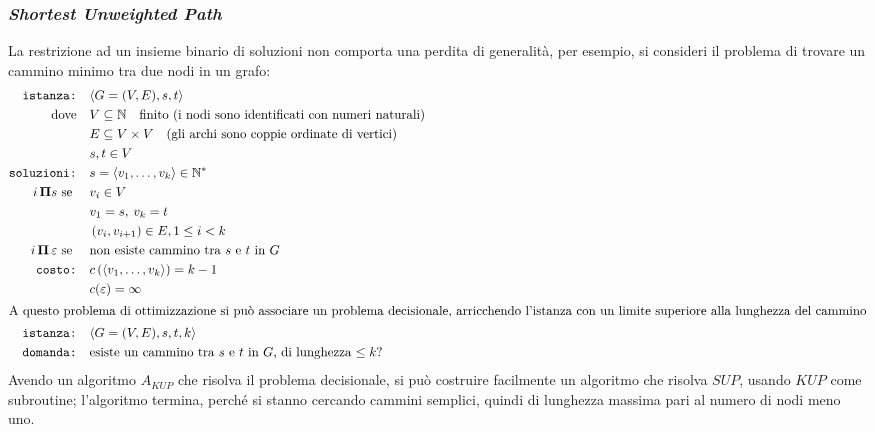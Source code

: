 \subsubsection{\emph{Shortest Unweighted Path}}
La restrizione ad un insieme binario di soluzioni non comporta una perdita di generalità, per esempio, si consideri il problema di trovare un cammino minimo tra due nodi in un grafo:
\begin{align*}
    \texttt{istanza:} \quad & \langle G=(V,E), s, t \rangle \\
    \text{dove} \quad & V \subseteq \mathbb{N} \quad \text{finito (i nodi sono identificati con numeri naturali)} \\
    & E \subseteq V \times V \quad \text{(gli archi sono coppie ordinate di vertici)} \\
    & s, t \in V \\
    \texttt{soluzioni:} \quad & s=\langle v_1, \dots, v_k \rangle \in \mathbb{N}^* \\
    i \, \bm{\Pi}{} s \text{ se } \quad & 
    v_i \in V \\
    & v_1=s, \: v_k=t \\
    & \left( v_i, v_{i+1} \right) \in E, 1 \leq i < k \\
    i \, \bm{\Pi}{} \, \varepsilon \text{ se } \quad & \text{non esiste cammino tra $s$ e $t$ in $G$} \\
    \texttt{costo:} \quad & c\left( \langle  v_1, \ldots, v_k  \rangle \right) = k-1 \\
    & c( \varepsilon ) = \infty \\
    \intertext{A questo problema di ottimizzazione si può associare un problema decisionale, arricchendo l'istanza con un limite superiore alla lunghezza del cammino}
    \texttt{istanza:} \quad & \langle G=(V,E), s, t, k \rangle \\
    \texttt{domanda:} \quad & \text{esiste un cammino tra $s$ e $t$ in $G$, di lunghezza $\leq k$?} \\
\end{align*}
Avendo un algoritmo $A_{KUP}$ che risolva il problema decisionale, si può costruire facilmente un algoritmo che risolva $SUP$, usando $KUP$ come subroutine; l'algoritmo termina, perché si stanno cercando cammini semplici, quindi di lunghezza massima pari al numero di nodi meno uno.
